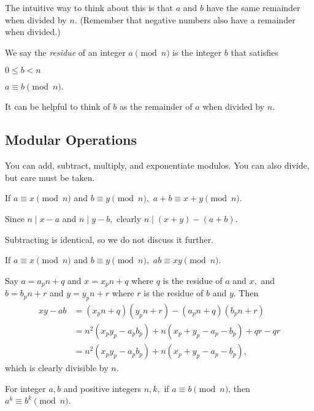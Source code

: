 \documentclass[mast]{lucky}
\begin{document}
The intuitive way to think about this is that $a$ and $b$ have the same remainder when divided by $n.$ (Remember that negative numbers also have a remainder when divided.)

\begin{defi}
We say the \textit{residue} of an integer $a\pmod{n}$ is the integer $b$ that satisfies
\begin{itemize}
    \Item $0\leq b<n$
    
    \Item $a\equiv b\pmod{n}.$
\end{itemize}
\end{defi}

It can be helpful to think of $b$ as the remainder of $a$ when divided by $n.$

\subsection{Modular Operations}
You can add, subtract, multiply, and exponentiate modulos. You can also divide, but care must be taken.

\begin{fact}[Adding]
If $a \equiv x\pmod{n}$ and $b\equiv y\pmod{n},$ $a+b\equiv x+y\pmod{n}.$
\end{fact}

\begin{pro}
Since $n\mid x-a$ and $n\mid y-b,$ clearly $n\mid(x+y)-(a+b).$
\end{pro}

Subtracting is identical, so we do not discuss it further.

\begin{fact}[Multiplying]
If $a \equiv x\pmod{n}$ and $b\equiv y\pmod{n},$ $ab\equiv xy\pmod{n}.$
\end{fact}

\begin{pro}
Say $a=a_pn+q$ and $x=x_pn+q$ where $q$ is the residue of $a$ and $x,$ and $b=b_pn+r$ and $y=y_pn+r$ where $r$ is the residue of $b$ and $y.$ Then
\begin{align*}
xy-ab&=(x_pn+q)(y_pn+r)-(a_pn+q)(b_pn+r)\\
&=n^2(x_py_p-a_pb_p)+n(x_p+y_p-a_p-b_p)+qr-qr\\
&=n^2(x_py_p-a_pb_p)+n(x_p+y_p-a_p-b_p),
\end{align*}
which is clearly divisible by $n.$
\end{pro}

\begin{fact}[Exponentiating]
For integer $a,b$ and positive integers $n,k,$ if $a \equiv b\pmod{n}$, then $a^k \equiv b^k \pmod{n}$.
\end{fact}
\end{document}
